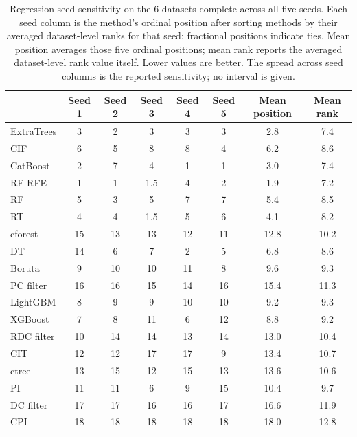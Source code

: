\begin{table}[!htbp]
  \centering
  \footnotesize
  \setlength{\tabcolsep}{4pt}
  \renewcommand{\arraystretch}{1.04}
  \begin{tabular}{@{}l
    S[table-format=2.0]
    S[table-format=2.0]
    S[table-format=2.0]
    S[table-format=2.0]
    S[table-format=2.0]
    S[table-format=2.1]
    S[table-format=2.1]@{}}
    \toprule
     & {Seed 1} & {Seed 2} & {Seed 3} & {Seed 4} & {Seed 5} & {Mean position} & {Mean rank} \\
    \midrule
    ExtraTrees & 3 & 2 & 3 & 3 & 3 & 2.8 & 7.4 \\
    CIF & 6 & 5 & 8 & 8 & 4 & 6.2 & 8.6 \\
    CatBoost & 2 & 7 & 4 & 1 & 1 & 3.0 & 7.4 \\
    RF-RFE & 1 & 1 & 1.5 & 4 & 2 & 1.9 & 7.2 \\
    RF & 5 & 3 & 5 & 7 & 7 & 5.4 & 8.5 \\
    RT & 4 & 4 & 1.5 & 5 & 6 & 4.1 & 8.2 \\
    cforest & 15 & 13 & 13 & 12 & 11 & 12.8 & 10.2 \\
    DT & 14 & 6 & 7 & 2 & 5 & 6.8 & 8.6 \\
    Boruta & 9 & 10 & 10 & 11 & 8 & 9.6 & 9.3 \\
    PC filter & 16 & 16 & 15 & 14 & 16 & 15.4 & 11.3 \\
    LightGBM & 8 & 9 & 9 & 10 & 10 & 9.2 & 9.3 \\
    XGBoost & 7 & 8 & 11 & 6 & 12 & 8.8 & 9.2 \\
    RDC filter & 10 & 14 & 14 & 13 & 14 & 13.0 & 10.4 \\
    CIT & 12 & 12 & 17 & 17 & 9 & 13.4 & 10.7 \\
    ctree & 13 & 15 & 12 & 15 & 13 & 13.6 & 10.6 \\
    PI & 11 & 11 & 6 & 9 & 15 & 10.4 & 9.7 \\
    DC filter & 17 & 17 & 16 & 16 & 17 & 16.6 & 11.9 \\
    CPI & 18 & 18 & 18 & 18 & 18 & 18.0 & 12.8 \\
    \bottomrule
  \end{tabular}
  \caption{Regression seed sensitivity on the 6 datasets complete across all
  five seeds. Each seed column is the method's ordinal position after sorting
  methods by their averaged dataset-level ranks for that seed; fractional
  positions indicate ties. Mean position
  averages those five ordinal positions; mean rank reports the averaged
  dataset-level rank value itself. Lower values are better. The spread across seed columns is the reported sensitivity; no interval is given.}
  \label{tab:regression-seed-sensitivity}
\end{table}

